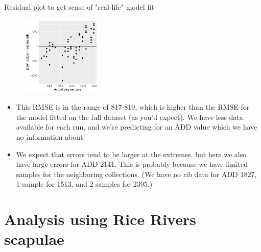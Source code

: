 \documentclass{beamer}
\begin{document}
\begin{frame}{Residual plot to get sense of "real-life" model fit}

  \begin{center}
  \begin{figure}
    \includegraphics[width=1.5in]{w_ribs/leave_out_one_rib_and_one_day_residuals}
  \end{figure}
  \end{center}  

  \vspace{0.1in}

  {\scriptsize
 
    \begin{itemize}
    \item This RMSE is in the range of 817-819, which is higher than
      the RMSE for the model fitted on the full dataset (as you'd expect).  We
      have less data available for each run, and we're predicting for an ADD
      value which we have no information about.
    \item We expect that errors tend to be larger at the extremes, but here we
    also have large errors for ADD 2141.  This is probably because we have
    limited samples for the neighboring collections.  (We have no rib data for
    ADD 1827, 1 sample for 1513, and 2 samples for 2395.)
    \end{itemize}
  }

\end{frame}




\section[Scapulae]{Analysis using Rice Rivers scapulae}
\end{document}
